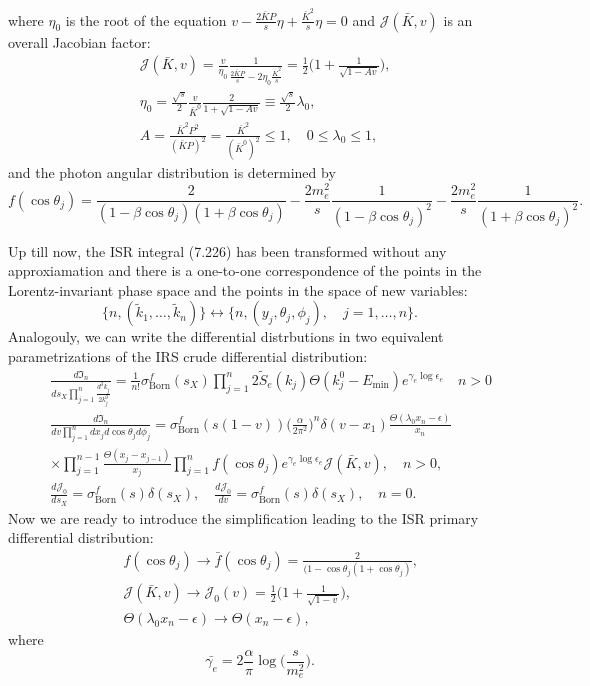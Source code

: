 where $\eta_0$ is the root of the equation $v-\frac{2\bar{K}P}{s}\eta+\frac{\bar{K}^2}{s}\eta=0$ and $\mathcal{J}(\bar{K},v)$ is an overall Jacobian factor:
\begin{align}
&\mathcal{J}(\bar{K},v)=\frac{v}{\eta_0}\frac{1}{\frac{2\bar{K}P}{s}-2\eta_0\frac{\bar{K}^2}{s}}=\frac{1}{2}\biggl(1+\frac{1}{\sqrt{1-Av}}\biggr),\nonumber\\
&\eta_0=\frac{\sqrt{s}}{2}\frac{v}{\bar{K}^0}\frac{2}{1+\sqrt{1-Av}}\equiv\frac{\sqrt{s}}{2}\lambda_0,\nonumber\\
&A=\frac{\bar{K}^2P^2}{(\bar{K}P)^2}=\frac{\bar{K}^2}{(\bar{K}^0)^2}\leq 1,\quad 0\leq\lambda_0\leq 1,
\end{align}
and the photon angular distribution is determined by
\begin{equation}
f(\cos\theta_j)=\frac{2}{(1-\beta\cos\theta_j)(1+\beta\cos\theta_j)}-\frac{2m^2_e}{s}\frac{1}{(1-\beta\cos\theta_j)^2}-\frac{2m^2_e}{s}\frac{1}{(1+\beta\cos\theta_j)^2}.
\end{equation}

Up till now, the ISR integral (7.226) has been transformed without any approxiamation and there is a one-to-one correspondence of the points in the Lorentz-invariant phase space and the points in the space of new variables:
\begin{equation}
\{n,(\widetilde{k}_1,\ldots,\widetilde{k}_{n})\}\leftrightarrow\{n,(y_j,\theta_j,\phi_j),\quad j=1,\ldots,n\}.
\end{equation}
Analogouly, we can write the differential distrbutions in two equivalent parametrizations of the IRS crude differential distribution:
\begin{eqnarray}
&&\frac{d\mathfrak{I}_n}{ds_X\prod_{j=1}^{n}\frac{d^3k_j}{2k^0_j}}=\frac{1}{n!}\sigma^f_\text{Born}(s_X)\prod_{j=1}^{n}2\widetilde{S}_e(k_j)\Theta(k^0_j-E_\text{min})e^{\gamma_e\log\epsilon_e}\quad n>0\nonumber\\
&&\frac{d\mathfrak{I}_n}{dv\prod_{j=1}^{n}dx_jd\cos\theta_jd\phi_j}=\sigma^f_\text{Born}(s(1-v))\biggl(\frac{\alpha}{2\pi^2}\biggr)^n\delta(v-x_1)\frac{\Theta(\lambda_0x_n-\epsilon)}{x_n}\nonumber\\
&&\times\prod_{j=1}^{n-1}\frac{\Theta(x_j-x_{j-1})}{x_j}\prod_{j=1}^{n}f(\cos\theta_j)e^{\gamma_e\log\epsilon_e}\mathcal{J}(\bar{K},v),\quad n>0,\nonumber\\
&&\frac{d\mathcal{J}_0}{ds_X}=\sigma^f_\text{Born}(s)\delta(s_X),\quad \frac{d\mathcal{J}_0}{dv}=\sigma^f_\text{Born}(s)\delta(s_X),\quad n=0.
\end{eqnarray}
Now we are ready to introduce the simplification leading to the ISR primary differential distribution:
\begin{eqnarray}
&&f(\cos\theta_j)\to\bar{f}(\cos\theta_j)=\frac{2}{(1-\cos\theta_j(1+\cos\theta_j)},\nonumber\\
&&\mathcal{J}(\bar{K},v)\to\mathcal{J}_0(v)=\frac{1}{2}\biggl(1+\frac{1}{\sqrt{1-v}}\biggr),\nonumber\\
&&\Theta(\lambda_0x_n-\epsilon)\to\Theta(x_n-\epsilon),
\end{eqnarray}
where 
\begin{equation}
\bar{\gamma_e}=2\frac{\alpha}{\pi}\log\biggl(\frac{s}{m^2_e}\biggr).
\end{equation}

